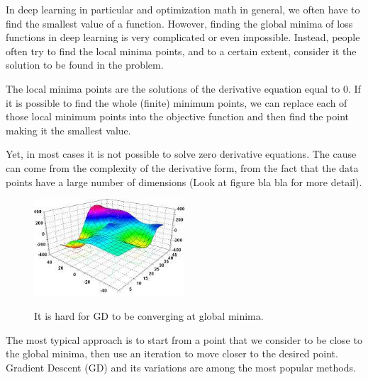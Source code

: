 	In deep learning in particular and optimization math in general, we often have to find the smallest value of a function. However, finding the global minima of loss functions in deep learning is very complicated or even impossible. Instead, people often try to find the local minima points, and to a certain extent, consider it the solution to be found in the problem.
	
	The local minima points are the solutions of the derivative equation equal to 0. If it is possible to find the whole (finite) minimum points, we can replace each of those local minimum points into the objective function and then find the point making it the smallest value. 
	
	Yet, in most cases it is not possible to solve zero derivative equations. The cause can come from the complexity of the derivative form, from the fact that the data points have a large number of dimensions (Look at figure bla bla for more detail).
	
	\begin{figure}[H]
		\centering
		{\includegraphics[width=0.5\textwidth]{./hinhanh/chap3/flutuate_plate.jpg}}
		\caption{It is hard for GD to be converging at global minima.}
	\end{figure}
	
	
	The most typical approach is to start from a point that we consider to be close to the global minima, then use an iteration to move closer to the desired point. Gradient Descent (GD) and its variations are among the most popular methods.
	
